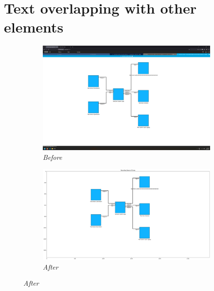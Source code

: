 \documentclass{article}
\begin{document}
\section{Text overlapping with other elements}
\begin{figure}[H]
    \centering
    \begin{subfigure}[t]{0.9\textwidth}
        \centering
        \includegraphics[width=\textwidth]{testcases/text_overlapping_with_other_elements/160243-325511_input_image.png}
        \caption*{\textit{Before}}
    \end{subfigure}
    \newline
    \begin{subfigure}[t]{0.9\textwidth}
        \centering
        \includegraphics[width=\textwidth]{testcases/text_overlapping_with_other_elements/160303-916118_element_bbox_errors_labeled_colored.png}
        \caption*{\textit{After}}
    \end{subfigure}
    \label{fig:text_overlapping}
\end{figure}
\newpage
\end{document}
